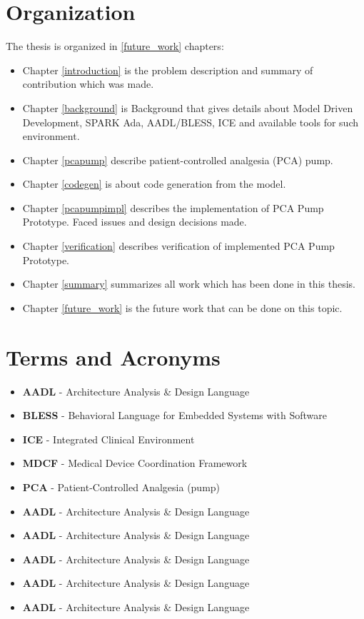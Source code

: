 \section{Organization}
\label{introduction:organization}
The thesis is organized in \ref{future_work} chapters:
\begin{itemize}
	\item Chapter \ref{introduction} is the problem description and summary of contribution which was made. 
	\item Chapter \ref{background} is Background that gives details about Model Driven Development, SPARK Ada, AADL/BLESS, ICE and available tools for such environment. 
	\item Chapter \ref{pcapump} describe patient-controlled analgesia (PCA) pump.
	\item Chapter \ref{codegen} is about code generation from the model. 
	\item Chapter \ref{pcapumpimpl} describes the implementation of PCA Pump Prototype. Faced issues and design decisions made.
	\item Chapter \ref{verification} describes verification of implemented PCA Pump Prototype. 
	\item Chapter \ref{summary} summarizes all work which has been done in this thesis. 
	\item Chapter \ref{future_work} is the future work that can be done on this topic.
\end{itemize}


\section{Terms and Acronyms}
\label{introduction:terms}

\begin{itemize}
	\item \textbf{AADL} - Architecture Analysis \& Design Language
	\item \textbf{BLESS} - Behavioral Language for Embedded Systems with Software
	\item \textbf{ICE} - Integrated Clinical Environment
	\item \textbf{MDCF} - Medical Device Coordination Framework
	\item \textbf{PCA} - Patient-Controlled Analgesia (pump)
	\item \textbf{AADL} - Architecture Analysis \& Design Language
	\item \textbf{AADL} - Architecture Analysis \& Design Language
	\item \textbf{AADL} - Architecture Analysis \& Design Language
	\item \textbf{AADL} - Architecture Analysis \& Design Language
	\item \textbf{AADL} - Architecture Analysis \& Design Language
\end{itemize}